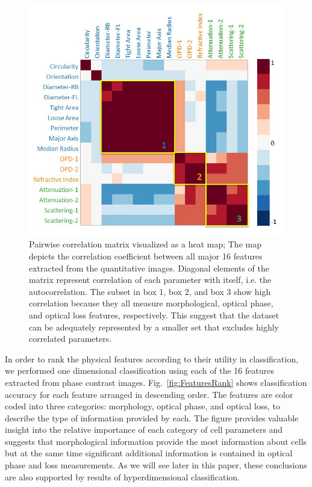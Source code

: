 \documentclass[aps,pra,reprint,superscriptaddress]{revtex4-1}
\begin{document}
\begin{figure}
\includegraphics[scale=0.6]{FigureCorrelation.jpg}
\caption{\label{fig:Correlation} Pairwise correlation matrix visualized as a heat map; The map depicts the correlation coefficient between all major 16 features extracted from the quantitative images. Diagonal elements of the matrix represent correlation of each parameter with itself, i.e. the autocorrelation. The subset in box 1, box 2, and box 3 show high correlation because they all measure morphological, optical phase, and optical loss features, respectively. This suggest that the dataset can be adequately represented by a smaller set that excludes highly correlated parameters.}
\end{figure}

In order to rank the physical features according to their utility in classification, we performed one dimensional classification using each of the 16 features extracted from phase contrast images. Fig.~\ref{fig:FeaturesRank} shows classification accuracy for each feature arranged in descending order. The features are color coded into three categories: morphology, optical phase, and optical loss, to describe the type of information provided by each. The figure provides valuable insight into the relative importance of each category of cell parameters and suggests that morphological information provide the most information about cells but at the same time significant additional information is contained in optical phase and loss measurements. As we will see later in this paper, these conclusions are also supported by results of hyperdimensional classification.
\end{document}
